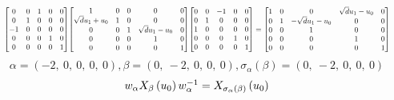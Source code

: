 \documentclass[11pt]{article}
\theoremstyle{definition}
\begin{document}
\[
\scaletoalign{\textwidth}{{\left[\begin{matrix}0 & 0 & 1 & 0 & 0\\0 & 1 & 0 & 0 & 0\\-1 & 0 & 0 & 0 & 0\\0 & 0 & 0 & 1 & 0\\0 & 0 & 0 & 0 & 1\end{matrix}\right]} {\left[\begin{matrix}1 & 0 & 0 & 0 & 0\\\sqrt{d} u_{1} + u_{0} & 1 & 0 & 0 & 0\\0 & 0 & 1 & \sqrt{d} u_{1} - u_{0} & 0\\0 & 0 & 0 & 1 & 0\\0 & 0 & 0 & 0 & 1\end{matrix}\right]} {\left[\begin{matrix}0 & 0 & -1 & 0 & 0\\0 & 1 & 0 & 0 & 0\\1 & 0 & 0 & 0 & 0\\0 & 0 & 0 & 1 & 0\\0 & 0 & 0 & 0 & 1\end{matrix}\right]} = {\left[\begin{matrix}1 & 0 & 0 & \sqrt{d} u_{1} - u_{0} & 0\\0 & 1 & - \sqrt{d} u_{1} - u_{0} & 0 & 0\\0 & 0 & 1 & 0 & 0\\0 & 0 & 0 & 1 & 0\\0 & 0 & 0 & 0 & 1\end{matrix}\right]}}
\]
\[
\alpha = \left( -2, \  0, \  0, \  0, \  0\right), \beta = \left( 0, \  -2, \  0, \  0, \  0\right), \sigma_{\alpha}(\beta) = \left( 0, \  -2, \  0, \  0, \  0\right)
\]
\[
\scaletoalign{\textwidth}{w_{\alpha} X_{\beta}\left(u_{0}\right) w_{\alpha}^{-1} = X_{\sigma_{\alpha}\left(\beta\right)}\left(u_{0}\right)}
\]
\end{document}
